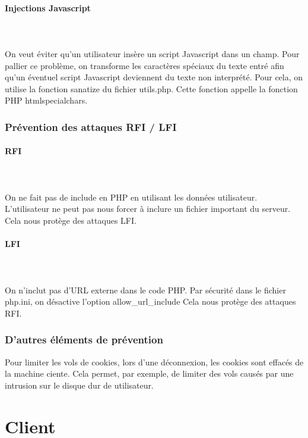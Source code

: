\documentclass[a4paper]{article}
\begin{document}
\paragraph{Injections Javascript}
~~\\
\\
On veut éviter qu'un utilisateur insère un script Javascript dans un champ.
Pour pallier ce problème, on transforme les caractères spéciaux du texte entré afin
qu'un éventuel script Javascript deviennent du texte non interprété.
Pour cela, on utilise la fonction sanatize du fichier utils.php. Cette fonction appelle
la fonction PHP htmlspecialchars.
		
		\subsubsection{Prévention des attaques RFI / LFI}
		
\paragraph{RFI}
~~\\
\\
On ne fait pas de include en PHP en utilisant les données utilisateur.
L'utilisateur ne peut pas nous forcer à inclure un fichier important du serveur.
Cela nous protège des attaques LFI.

\paragraph{LFI}
~~\\
\\
On n'inclut pas d'URL externe dans le code PHP.
Par sécurité dans le fichier php.ini, on désactive l'option allow\_url\_include 
Cela nous protège des attaques RFI.
		
		\subsubsection{D'autres éléments de prévention}
		
Pour limiter les vols de cookies, lors d'une déconnexion, les cookies sont effacés de la machine ciente.
Cela permet, par exemple, de limiter des vols causés par une intrusion sur le disque dur de utilisateur.
 		
\section{Client}
\end{document}
